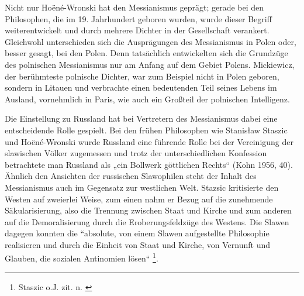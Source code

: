 \documentclass{../../sem_paper}
\begin{document}
Nicht nur Hoëné-Wronski hat den Messianismus geprägt; gerade bei den Philosophen, die im
19. Jahrhundert geboren wurden, wurde dieser Begriff weiterentwickelt und durch mehrere
Dichter in der Gesellschaft verankert. Gleichwohl unterschieden sich die Ausprägungen des
Messianismus in Polen oder, besser gesagt, bei den Polen. Denn tatsächlich entwickelten sich
die Grundzüge des polnischen Messianismus nur am Anfang auf dem Gebiet Polens.
Mickiewicz, der berühmteste polnische Dichter, war zum Beispiel nicht in Polen geboren,
sondern in Litauen und verbrachte einen bedeutenden Teil seines Lebens im Ausland,
vornehmlich in Paris, wie auch ein Großteil der polnischen Intelligenz\autocite{braechter}.

Die Einstellung zu Russland hat bei Vertretern des Messianismus dabei eine entscheidende
Rolle gespielt. Bei den frühen Philosophen wie Stanisław Staszic und Hoëné-Wronski wurde
Russland eine führende Rolle bei der Vereinigung der slawischen Völker zugemessen und
trotz der unterschiedlichen Konfession betrachtete man Russland als „ein Bollwerk göttlichen
Rechts“ (Kohn 1956, 40). Ähnlich den Ansichten der russischen Slawophilen steht der Inhalt
des Messianismus auch im Gegensatz zur westlichen Welt. Stazsic kritisierte den Westen auf
zweierlei Weise, zum einen nahm er Bezug auf die zunehmende Säkularisierung, also die
Trennung zwischen Staat und Kirche und zum anderen auf die Demoralisierung
durch die Eroberungsfeldzüge des Westens\autocite[39]{kohn}. Die Slawen dagegen
konnten die “absolute, von einem Slawen aufgestellte Philosophie realisieren und durch die
Einheit von Staat und Kirche, von Vernunft und Glauben, die sozialen Antinomien lösen“
\footnote{Staszic o.J. zit. n. \autocite[40]{kohn}}.
\end{document}
